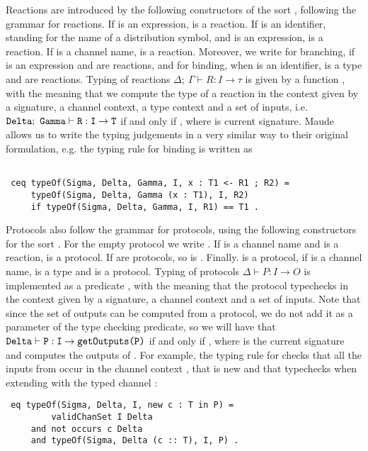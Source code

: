 Reactions are introduced by the following constructors of the sort
, following the grammar for reactions. If  is an expression,  is a reaction. If  is an identifier, standing for the name of a
distribution symbol, and  is an expression,  
is a reaction. If  is a channel name,  is a reaction.
Moreover, we write  for branching, if  is an expression and  are reactions, and  for binding, when  is an identifier,  is a type and 
 are reactions.
Typing of reactions $\Delta; \ \Gamma \vdash R : I \to \tau$ is given by a function
, 
with the meaning that
we compute the type of a reaction in the context given by a signature, a channel context, a type context and a set of inputs, 
i.e. $\texttt{Delta}; \ \texttt{Gamma} \vdash \texttt{R} : \texttt{I} \to \texttt{T}$ 
if and only if 
, where  is 
current signature. 
Maude allows us to write the typing
judgements in a very similar way to their original formulation, e.g. the typing rule for binding is written as
\begin{lstlisting}

 ceq typeOf(Sigma, Delta, Gamma, I, x : T1 <- R1 ; R2) = 
     typeOf(Sigma, Delta, Gamma (x : T1), I, R2)
     if typeOf(Sigma, Delta, Gamma, I, R1) == T1 .

\end{lstlisting}

Protocols also follow the grammar for protocols, using the following
constructors for the sort . For the empty protocol we write
. If  is a channel name and  is a 
reaction,  is a protocol. If  are protocols,
so is . Finally.  is a protocol,
if  is a channel name,  is a type and  is a protocol. Typing of protocols $\Delta \vdash P : I \to O$ is implemented as a predicate
, with the meaning that the protocol typechecks 
in the context given by a signature, a channel context and a set of inputs.
Note that since the set of outputs can be computed from a protocol, we
do not add it as a parameter of the type checking predicate, so we will have that
$\texttt{Delta} \vdash \texttt{P} : \texttt{I} \to \texttt{getOutputs(P)}$ 
if and only if
,
where  is the current signature and
 computes the outputs of .
For example, the typing rule for  checks that 
all the inputs from  occur in the channel context
, that  is new and that  typechecks
when extending  with the typed channel :
\begin{lstlisting}
 eq typeOf(Sigma, Delta, I, new c : T in P) =
         validChanSet I Delta
     and not occurs c Delta
     and typeOf(Sigma, Delta (c :: T), I, P) .   
\end{lstlisting}


